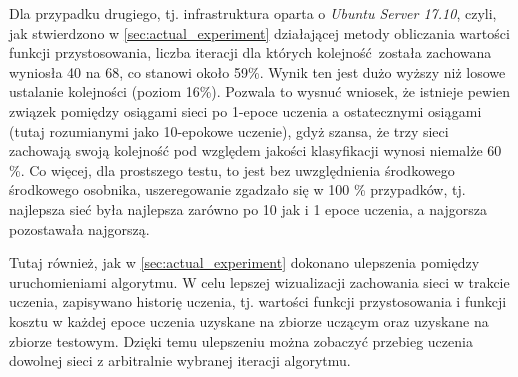 Dla przypadku drugiego, tj. infrastruktura oparta o \textit{Ubuntu Server 17.10}, czyli, jak stwierdzono w \ref{sec:actual_experiment} działającej metody obliczania wartości funkcji przystosowania, liczba iteracji dla których kolejność została zachowana wyniosła 40 na 68, co stanowi około 59\%.
Wynik ten jest dużo wyższy niż losowe ustalanie kolejności (poziom 16\%).
Pozwala to wysnuć wniosek, że istnieje pewien związek pomiędzy osiągami sieci po 1-epoce uczenia a ostatecznymi osiągami (tutaj rozumianymi jako 10-epokowe uczenie), gdyż szansa, że trzy sieci zachowają swoją kolejność pod względem jakości klasyfikacji wynosi niemalże 60 \%.
Co więcej, dla prostszego testu, to jest bez uwzględnienia środkowego środkowego osobnika, uszeregowanie zgadzało się w 100 \% przypadków, tj. najlepsza sieć była najlepsza zarówno po 10 jak i 1 epoce uczenia, a najgorsza pozostawała najgorszą.

Tutaj również, jak w \ref{sec:actual_experiment} dokonano ulepszenia pomiędzy uruchomieniami algorytmu.
W celu lepszej wizualizacji zachowania sieci w trakcie uczenia, zapisywano historię uczenia, tj. wartości funkcji przystosowania i funkcji kosztu w każdej epoce uczenia uzyskane na zbiorze uczącym oraz uzyskane na zbiorze testowym.
Dzięki temu ulepszeniu można zobaczyć przebieg uczenia dowolnej sieci z arbitralnie wybranej iteracji algorytmu.

